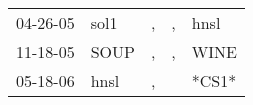 \begin{supertabular}{p{0.07\textwidth}p{0.06\textwidth}p{0.02\textwidth}p{0.02\textwidth}p{0.06\textwidth}}
 04-26-05\textsuperscript{} &  sol1\textsuperscript{} &  , &  , &  hnsl\textsuperscript{} \\
 11-18-05\textsuperscript{} &  SOUP\textsuperscript{} &  , &  , &  WINE\textsuperscript{} \\
 05-18-06\textsuperscript{} &  hnsl\textsuperscript{} &  , &    &                   *CS1* \\
\end{supertabular}
